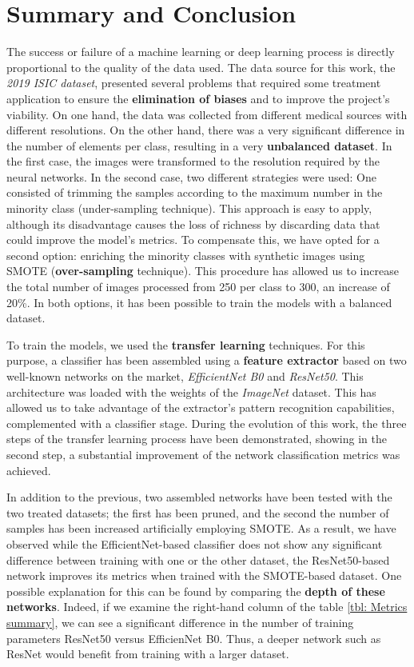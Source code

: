 \chapter{Summary and Conclusion}
\label{chapter: Conclusion}

The success or failure of a machine learning or deep learning process is directly proportional to the quality of the data used. The data source for this work, the \textit{2019 ISIC dataset}, presented several problems that required some treatment application to ensure the \textbf{elimination of biases} and to improve the project's viability. On one hand, the data was collected from different medical sources with different resolutions. On the other hand, there was a very significant difference in the number of elements per class, resulting in a very \textbf{unbalanced dataset}. In the first case, the images were transformed to the resolution required by the neural networks. In the second case, two different strategies were used: One consisted of trimming the samples according to the maximum number in the minority class (under-sampling technique). This approach is easy to apply, although its disadvantage causes the loss of richness by discarding data that could improve the model's metrics. To compensate this, we have opted for a second option: enriching the minority classes with synthetic images using SMOTE (\textbf{over-sampling} technique). This procedure has allowed us to increase the total number of images processed from 250 per class to 300, an increase of 20\%. In both options, it has been possible to train the models with a balanced dataset. 

To train the models, we used the \textbf{transfer learning} techniques. For this purpose, a classifier has been assembled using a \textbf{feature extractor} based on two well-known networks on the market, \textit{EfficientNet B0} and \textit{ResNet50}. This architecture was loaded with the weights of the \textit{ImageNet} dataset. This has allowed us to take advantage of the extractor's pattern recognition capabilities, complemented with a classifier stage. During the evolution of this work, the three steps of the transfer learning process have been demonstrated, showing in the second step, a substantial improvement of the network classification metrics was achieved.

In addition to the previous, two assembled networks have been tested with the two treated datasets; the first has been pruned, and the second the number of samples has been increased artificially employing SMOTE. As a result, we have observed while the EfficientNet-based classifier does not show any significant difference between training with one or the other dataset, the ResNet50-based network improves its metrics when trained with the SMOTE-based dataset. One possible explanation for this can be found by comparing the \textbf{depth of these networks}. Indeed, if we examine the right-hand column of the table \ref{tbl: Metrics summary}, we can see a significant difference in the number of training parameters ResNet50 versus EfficienNet B0. Thus, a deeper network such as ResNet would benefit from training with a larger dataset.


